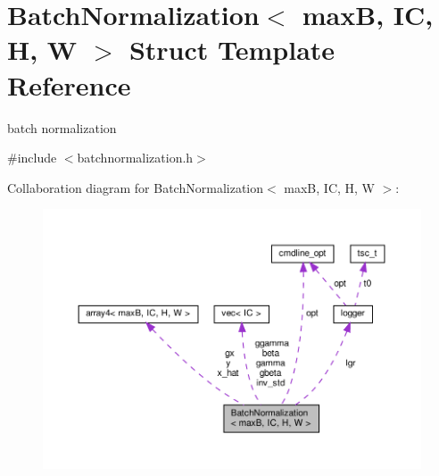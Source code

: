 \hypertarget{structBatchNormalization}{}\section{Batch\+Normalization$<$ maxB, IC, H, W $>$ Struct Template Reference}
\label{structBatchNormalization}


batch normalization  




{\ttfamily \#include $<$batchnormalization.\+h$>$}



Collaboration diagram for Batch\+Normalization$<$ maxB, IC, H, W $>$\+:
\nopagebreak
\begin{figure}[H]
\begin{center}
\leavevmode
\includegraphics[width=350pt]{structBatchNormalization__coll__graph}
\end{center}
\end{figure}
